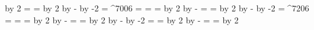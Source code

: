 {\divide\tempwidth by 2 %
\setbox\Tempsign=\hbox{\gregorianfont {}}%
\tempsignwidth=\wd\Tempsign %
\divide\tempsignwidth by 2 %
\advance\tempwidth by \tempsignwidth %
\kern -\tempwidth%
\raise \glyphraisevalue \copy\Tempsign %
\advance\tempwidth by -2\tempsignwidth %
\kern \tempwidth%
\or%
\setbox\Tempsign=\hbox{\gregorianfont ^^^^7006}%
\tempwidth=\wd\Tempsign %
\setbox\Tempsign=\hbox{\gregorianfont {}}%
\tempsignwidth=\wd\Tempsign%
\divide\tempsignwidth by 2 %
\advance\tempwidth by -\tempsignwidth %
\setbox\Tempsign=\hbox{\gregorianfont {}}%
\tempsignwidth=\wd\Tempsign %
\divide\tempsignwidth by 2 %
\advance\tempwidth by \tempsignwidth %
\kern -\tempwidth%
\raise \glyphraisevalue \copy\Tempsign %
\advance\tempwidth by -2\tempsignwidth %
\kern \tempwidth%
\or%
\setbox\Tempsign=\hbox{\gregorianfont ^^^^7206}%
\tempwidth=\wd\Tempsign %
\setbox\Tempsign=\hbox{\gregorianfont {}}%
\tempsignwidth=\wd\Tempsign%
\divide\tempsignwidth by 2 %
\advance\tempwidth by -\tempsignwidth %
\setbox\Tempsign=\hbox{\gregorianfont {}}%
\tempsignwidth=\wd\Tempsign %
\divide\tempsignwidth by 2 %
\advance\tempwidth by \tempsignwidth %
\kern -\tempwidth%
\raise \glyphraisevalue \copy\Tempsign %
\advance\tempwidth by -2\tempsignwidth %
\kern \tempwidth%
\or%
\setbox\Tempsign=\hbox{\gregorianfont {}}%
\tempsignwidth=\wd\Tempsign%
\divide\tempsignwidth by 2 %
\advance\tempwidth by -\tempsignwidth %
\setbox\Tempsign=\hbox{\gregorianfont {}}%
\tempsignwidth=\wd\Tempsign %
\divide\tempsignwidth by 2 %
}
